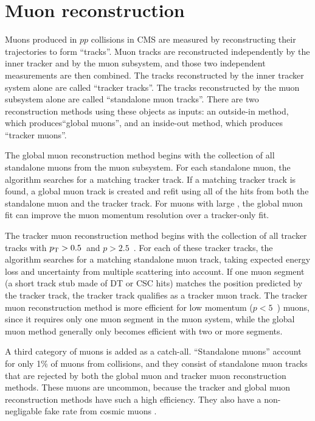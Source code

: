 \section{Muon reconstruction}
\label{sec:reco-muon}

Muons produced in $pp$ collisions in CMS 
are measured by reconstructing their trajectories to form ``tracks''.
Muon tracks are reconstructed independently 
by the inner tracker and by the muon subsystem, and those two
independent measurements are then combined.
The tracks reconstructed by the inner tracker system alone 
are called ``tracker tracks''.
The tracks reconstructed by the muon subsystem alone are called
``standalone muon tracks''.
There are two reconstruction methods using these objects 
as inputs: an outside-in method, which produces``global muons'',
and an inside-out method, which produces ``tracker muons''.

The global muon reconstruction method begins with the
collection of all standalone muons from the muon subsystem.
For each standalone muon, the algorithm searches for a matching
tracker track.  If a matching tracker track is found, 
a global muon track is created and refit
using all of the hits from both the standalone muon and the 
tracker track.  For muons with large \pt, the global muon 
fit can improve the muon momentum resolution over a tracker-only fit.

The tracker muon reconstruction method begins with the 
collection of all tracker tracks with $p_{\text{T}}>0.5$~\GeV and 
$p>2.5$~\GeV.  For each of these tracker tracks, the algorithm
searches for a matching standalone muon track, taking expected
energy loss and uncertainty from multiple scattering into account.
If one muon segment (a short track stub made of DT or CSC hits) 
matches the position predicted by the tracker track, 
the tracker track qualifies as a tracker muon track.  The
tracker muon reconstruction method is more efficient for low
momentum ($p < 5$~\GeV) muons, since it requires only one muon segment in the 
muon system, while the global muon method generally only
becomes efficient with two or more segments.

A third category of muons is added as a catch-all.  ``Standalone muons'' 
account for only 1\% of muons from collisions, and they consist of 
standalone muon tracks that are rejected by both the global muon 
and tracker muon reconstruction methods.  These muons are uncommon,
because the tracker and global muon reconstruction methods have such
a high efficiency.  They also have a non-negligable fake rate 
from cosmic muons \cite{muon-1}.
